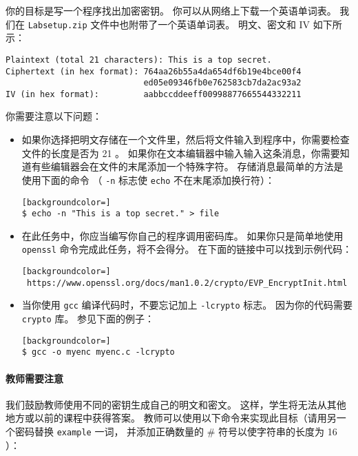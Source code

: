 你的目标是写一个程序找出加密密钥。
你可以从网络上下载一个英语单词表。
我们在 \texttt{Labsetup.zip} 文件中也附带了一个英语单词表。
明文、密文和 IV 如下所示：


\begin{lstlisting}
Plaintext (total 21 characters): This is a top secret.
Ciphertext (in hex format): 764aa26b55a4da654df6b19e4bce00f4
                            ed05e09346fb0e762583cb7da2ac93a2
IV (in hex format):         aabbccddeeff00998877665544332211
\end{lstlisting}



你需要注意以下问题：

\begin{itemize}
\item 如果你选择把明文存储在一个文件里，然后将文件输入到程序中，你需要检查文件的长度是否为 21 。
如果你在文本编辑器中输入输入这条消息，你需要知道有些编辑器会在文件的末尾添加一个特殊字符。
存储消息最简单的方法是使用下面的命令
（ \texttt{-n} 标志使 \texttt{echo} 不在末尾添加换行符）：


\begin{lstlisting}[backgroundcolor=]
$ echo -n "This is a top secret." > file
\end{lstlisting}

\item 在此任务中，你应当编写你自己的程序调用密码库。
如果你只是简单地使用 {\tt openssl} 命令完成此任务，将不会得分。
在下面的链接中可以找到示例代码：
\begin{lstlisting}[backgroundcolor=]
 https://www.openssl.org/docs/man1.0.2/crypto/EVP_EncryptInit.html
\end{lstlisting}


\item 当你使用 \texttt{gcc} 编译代码时，不要忘记加上 \texttt{-lcrypto} 标志。
因为你的代码需要 \texttt{crypto} 库。
参见下面的例子：

\begin{lstlisting}[backgroundcolor=]
$ gcc -o myenc myenc.c -lcrypto
\end{lstlisting}

\end{itemize}

\paragraph{教师需要注意}
我们鼓励教师使用不同的密钥生成自己的明文和密文。
这样，学生将无法从其他地方或以前的课程中获得答案。
教师可以使用以下命令来实现此目标（请用另一个密码替换 \texttt{example} 一词，
并添加正确数量的 \# 符号以使字符串的长度为 16 ）：

